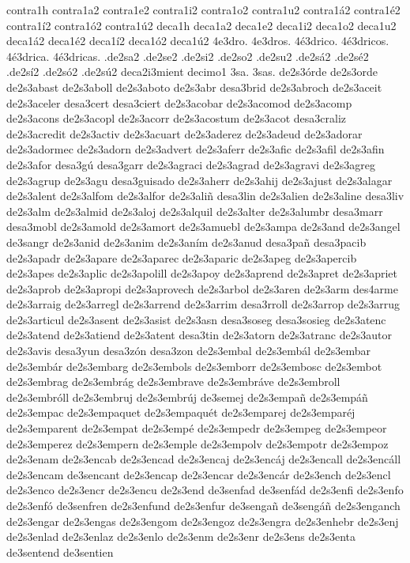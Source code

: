 {contra1h
contra1a2 contra1e2 contra1i2 contra1o2 contra1u2
contra1á2 contra1é2 contra1í2 contra1ó2 contra1ú2
deca1h
deca1a2 deca1e2 deca1i2 deca1o2 deca1u2
deca1á2 deca1é2 deca1í2 deca1ó2 deca1ú2
4e3dro.
4e3dros.
4é3drico.
4é3dricos.
4é3drica.
4é3dricas.
.de2sa2 .de2se2 .de2si2 .de2so2 .de2su2
.de2sá2 .de2sé2 .de2sí2 .de2só2 .de2sú2
deca2i3mient
decimo1
3sa.
3sas.
de2s3órde
de2s3orde
de2s3abast
de2s3aboll
de2s3aboto
de2s3abr
desa3brid
de2s3abroch
de2s3aceit
de2s3aceler
desa3cert
desa3ciert
de2s3acobar
de2s3acomod
de2s3acomp
de2s3acons
de2s3acopl
de2s3acorr
de2s3acostum
de2s3acot
desa3craliz
de2s3acredit
de2s3activ
de2s3acuart
de2s3aderez
de2s3adeud
de2s3adorar
de2s3adormec
de2s3adorn
de2s3advert
de2s3aferr
de2s3afic
de2s3afil
de2s3afin
de2s3afor
desa3gú
desa3garr
de2s3agraci
de2s3agrad
de2s3agravi
de2s3agreg
de2s3agrup
de2s3agu
desa3guisado
de2s3aherr
de2s3ahij
de2s3ajust
de2s3alagar
de2s3alent
de2s3alfom
de2s3alfor
de2s3aliñ
desa3lin
de2s3alien
de2s3aline
desa3liv
de2s3alm
de2s3almid
de2s3aloj
de2s3alquil
de2s3alter
de2s3alumbr
desa3marr
desa3mobl
de2s3amold
de2s3amort
de2s3amuebl
de2s3ampa
de2s3and
de2s3angel
de3sangr
de2s3anid
de2s3anim
de2s3aním
de2s3anud
desa3pañ
desa3pacib
de2s3apadr
de2s3apare
de2s3aparec
de2s3aparic
de2s3apeg
de2s3apercib
de2s3apes
de2s3aplic
de2s3apolill
de2s3apoy
de2s3aprend
de2s3apret
de2s3apriet
de2s3aprob
de2s3apropi
de2s3aprovech
de2s3arbol
de2s3aren
de2s3arm
des4arme
de2s3arraig
de2s3arregl
de2s3arrend
de2s3arrim
desa3rroll
de2s3arrop
de2s3arrug
de2s3articul
de2s3asent
de2s3asist
de2s3asn
desa3soseg
desa3sosieg
de2s3atenc
de2s3atend
de2s3atiend
de2s3atent
desa3tin
de2s3atorn
de2s3atranc
de2s3autor
de2s3avis
desa3yun
desa3zón
desa3zon
de2s3embal
de2s3embál
de2s3embar
de2s3embár
de2s3embarg
de2s3embols
de2s3emborr
de2s3embosc
de2s3embot
de2s3embrag
de2s3embrág
de2s3embrave
de2s3embráve
de2s3embroll
de2s3embróll
de2s3embruj
de2s3embrúj
de3semej
de2s3empañ
de2s3empáñ
de2s3empac
de2s3empaquet
de2s3empaquét
de2s3emparej
de2s3emparéj
de2s3emparent
de2s3empat
de2s3empé
de2s3empedr
de2s3empeg
de2s3empeor
de2s3emperez
de2s3empern
de2s3emple
de2s3empolv
de2s3empotr
de2s3empoz
de2s3enam
de2s3encab
de2s3encad
de2s3encaj
de2s3encáj
de2s3encall
de2s3encáll
de2s3encam
de3sencant
de2s3encap
de2s3encar
de2s3encár
de2s3ench
de2s3encl
de2s3enco
de2s3encr
de2s3encu
de2s3end
de3senfad
de3senfád
de2s3enfi
de2s3enfo
de2s3enfó
de3senfren
de2s3enfund
de2s3enfur
de3sengañ
de3sengáñ
de2s3enganch
de2s3engar
de2s3engas
de2s3engom
de2s3engoz
de2s3engra
de2s3enhebr
de2s3enj
de2s3enlad
de2s3enlaz
de2s3enlo
de2s3enm
de2s3enr
de2s3ens
de2s3enta
de3sentend
de3sentien
}
